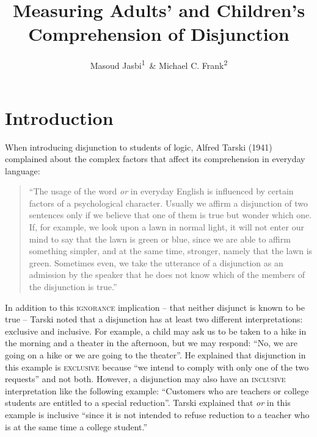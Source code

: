 \documentclass[floatsintext,man]{apa6}
\title{Measuring Adults' and Children's Comprehension of Disjunction}
\author{Masoud Jasbi\textsuperscript{1}~\& Michael C. Frank\textsuperscript{2}}
\affiliation{
    \vspace{0.5cm}
          \textsuperscript{1} Harvard University\\
          \textsuperscript{2} Stanford University  }
\theoremstyle{definition}
\theoremstyle{definition}
\theoremstyle{definition}
\theoremstyle{remark}
\begin{document}
\maketitle

\setcounter{secnumdepth}{0}



\section{Introduction}\label{introduction}

When introducing disjunction to students of logic, Alfred Tarski (1941)
complained about the complex factors that affect its comprehension in
everyday language:

\begin{quote}
\enquote{The usage of the word \emph{or} in everyday English is
influenced by certain factors of a psychological character. Usually we
affirm a disjunction of two sentences only if we believe that one of
them is true but wonder which one. If, for example, we look upon a lawn
in normal light, it will not enter our mind to say that the lawn is
green or blue, since we are able to affirm something simpler, and at the
same time, stronger, namely that the lawn is green. Sometimes even, we
take the utterance of a disjunction as an admission by the speaker that
he does not know which of the members of the disjunction is true.}
\end{quote}

In addition to this \textsc{ignorance} implication -- that neither
disjunct is known to be true -- Tarski noted that a disjunction has at
least two different interpretations: exclusive and inclusive. For
example, a child may ask us to be taken to a hike in the morning and a
theater in the afternoon, but we may respond: \enquote{No, we are going
on a hike or we are going to the theater}. He explained that disjunction
in this example is \textsc{exclusive} because \enquote{we intend to
comply with only one of the two requests} and not both. However, a
disjunction may also have an \textsc{inclusive} interpretation like the
following example: \enquote{Customers who are teachers or college
students are entitled to a special reduction}. Tarski explained that
\emph{or} in this example is inclusive \enquote{since it is not intended
to refuse reduction to a teacher who is at the same time a college
student.}
\end{document}
